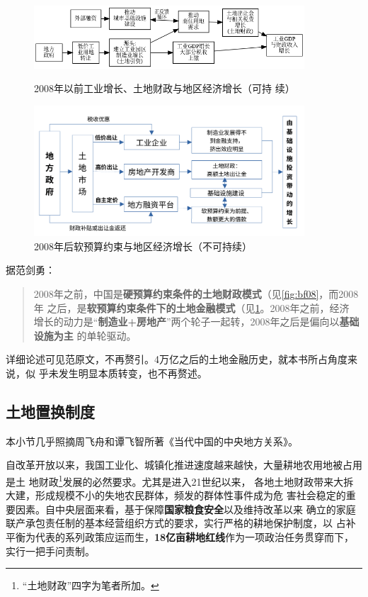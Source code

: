 \begin{figure}[htbp!]
  \centering
  \includegraphics[width=0.9\textwidth]{figures/before08.png}
  \caption{\label{fig:bf08}2008年以前工业增长、土地财政与地区经济增长（可持
    续） }

  \includegraphics[width=0.9\textwidth]{figures/after08}
  \caption{\label{fig:af08}2008年后软预算约束与地区经济增长（不可持续） }
\end{figure}

据范剑勇\cite{fanjianyong}：
\begin{quotation}
  2008年之前，中国是\textbf{硬预算约束条件的土地财政模式}（见\cref{fig:bf08}，而2008年
  之后，是\textbf{软预算约束条件下的土地金融模式}（见\cref{fig:af08}。2008年之前，经济
  增长的动力是“\textbf{制造业+房地产}”两个轮子一起转，2008年之后是偏向以\textbf{基础设施为主}
  的单轮驱动。
\end{quotation}

详细论述可见范原文，不再赘引。4万亿之后的土地金融历史，就本书所占角度来说，似
乎未发生明显本质转变，也不再赘述。

\subsection{土地置换制度}

本小节几乎照摘周飞舟和谭飞智所著《当代中国的中央地方关系》。

自改革开放以来，我国工业化、城镇化推进速度越来越快，大量耕地农用地被占用是土
地财政\footnote{“土地财政”四字为笔者所加。}发展的必然要求。尤其是进入21世纪以来，
各地土地财政带来大拆大建，形成规模不小的失地农民群体，频发的群体性事件成为危
害社会稳定的重要因素。自中央层面来看，基于保障\textbf{国家粮食安全}以及维持改革以来
确立的家庭联产承包责任制的基本经营组织方式的要求，实行严格的耕地保护制度，以
占补平衡为代表的系列政策应运而生，\textbf{18亿亩耕地红线}作为一项政治任务贯穿而下，
实行一把手问责制。

